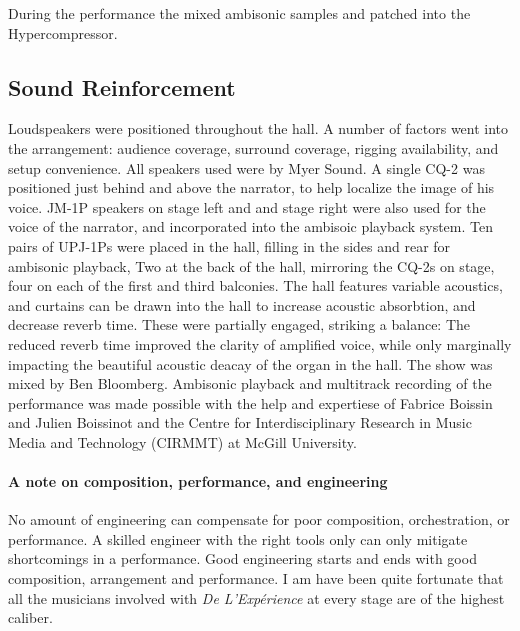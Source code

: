 During the performance the mixed ambisonic samples and patched into
the Hypercompressor. 




\subsection{Sound Reinforcement}
\label{sec:sound-reinforcement}
Loudspeakers were positioned throughout the hall. A number of factors
went into the arrangement: audience coverage, surround coverage,
rigging availability, and setup convenience. All speakers used were by
Myer Sound. A single CQ-2
was positioned just behind and above the narrator, to help localize
the image of his voice.  JM-1P speakers on stage left and and stage
right were also used for the voice of the narrator, and incorporated
into the ambisoic playback system. Ten pairs of UPJ-1Ps were placed in
the hall, filling in the sides and rear for ambisonic playback, Two at
the back of the hall, mirroring the CQ-2s on stage, four on each of
the first and third balconies.  The hall features variable acoustics,
and curtains can be drawn into the hall to increase acoustic
absorbtion, and decrease reverb time. These were partially engaged,
striking a balance: The reduced reverb time improved the clarity of
amplified voice, while only marginally impacting the beautiful
acoustic deacay of the organ in the hall. The show was mixed by Ben
Bloomberg. Ambisonic playback and multitrack recording of the
performance was made possible with the help and expertiese of Fabrice
Boissin and Julien Boissinot and the Centre for Interdisciplinary
Research in Music Media and Technology (CIRMMT) at McGill University.

\paragraph{A note on composition, performance, and engineering}
No amount of engineering can compensate for poor composition,
orchestration, or performance. A skilled engineer with the right tools
only can only mitigate shortcomings in a performance. Good engineering
starts and ends with good composition, arrangement and performance. I
am have been quite fortunate that all the musicians involved with
\textit{De L'Exp\'{e}rience} at every stage are of the highest
caliber.


